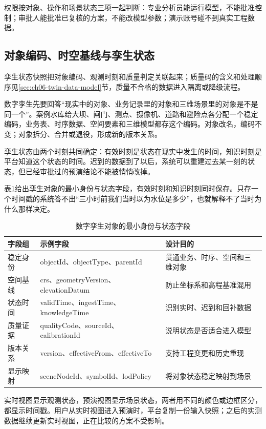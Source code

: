 权限按对象、操作和场景状态三项一起判断：专业分析员能运行模型，不能批准控制；审批人能批准已复核的方案，不能改模型参数；演示账号碰不到真实工程数据。

\subsection{对象编码、时空基线与孪生状态}\label{sec:ch08-twin-event-quality}

孪生状态快照把对象编码、观测时刻和质量判定关联起来；质量码的含义和处理顺序见\ref{sec:ch06-twin-data-model}节，质量不合格的数据进入隔离或降级流程。

数字孪生先要回答“现实中的对象、业务记录里的对象和三维场景里的对象是不是同一个”。案例水库给大坝、闸门、测点、摄像机、道路和避险点各分配一个稳定编码，业务表、时序数据、空间要素和三维模型都存这个编码。对象改名，编码不变；对象拆分、合并或退役，形成新的版本关系。

孪生状态由两个时刻共同确定：有效时刻是状态在现实中发生的时间，知识时刻是平台知道这个状态的时间。迟到的数据到了以后，系统可以重建过去某一刻的状态，但已经审批过的预演结论不能被悄悄改掉。

表\ref{tab:twin-object-state}给出孪生对象的最小身份与状态字段，有效时刻和知识时刻同时保存。只存一个时间戳的系统答不出“三小时前我们当时以为水位是多少”，也就解释不了当时为什么那样决定。

\begin{table}[htbp]
\centering
\caption{数字孪生对象的最小身份与状态字段}
\label{tab:twin-object-state}
\begin{tabular}{p{2.4cm}p{4.6cm}p{5.6cm}}
\toprule
字段组 & 示例字段 & 设计目的 \\
\midrule
稳定身份 & objectId、objectType、parentId & 贯通业务、时序、空间和三维对象 \\
空间基线 & crs、geometryVersion、elevationDatum & 防止坐标系和高程基准混用 \\
状态时间 & validTime、ingestTime、knowledgeTime & 识别实时、迟到和回补数据 \\
质量证据 & qualityCode、sourceId、calibrationId & 说明状态是否适合进入模型 \\
版本关系 & version、effectiveFrom、effectiveTo & 支持工程变更和历史重现 \\
显示映射 & sceneNodeId、symbolId、lodPolicy & 将对象状态稳定映射到场景 \\
\bottomrule
\end{tabular}
\end{table}

实时视图显示观测状态，预演视图显示场景状态，两者用不同的颜色或边框区分，都显示时间戳。用户从实时视图进入预演时，平台复制一份输入快照；之后的实测数据继续更新实时视图，正在比较的方案不受影响。

